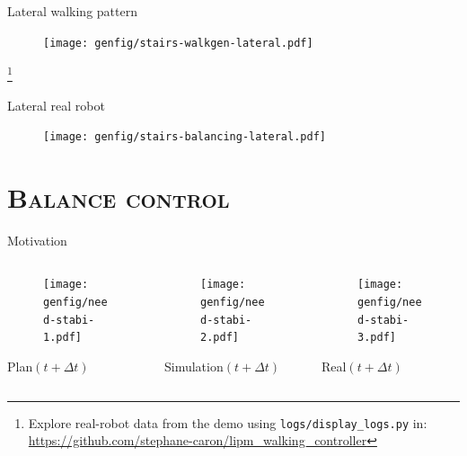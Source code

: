 \documentclass[9pt, aspectratio=43]{beamer}
\newcommand\blfootnote[1]{%
  \begingroup
  \renewcommand\thefootnote{}%
  \footnote{#1}%
  \addtocounter{footnote}{-1}%
  \endgroup
}
\begin{document}
\begin{frame}{Lateral walking pattern}
    \begin{figure}
        \centering
        \texttt{[image: genfig/stairs-walkgen-lateral.pdf]}
    \end{figure}
    \blfootnote{
        Explore real-robot data from the demo using \texttt{logs/display\_logs.py} in: \url{https://github.com/stephane-caron/lipm_walking_controller}
    }
\end{frame}

\begin{frame}{Lateral real robot}
    \begin{figure}
        \centering
        \texttt{[image: genfig/stairs-balancing-lateral.pdf]}
    \end{figure}
\end{frame}


\section*{\textsc{Balance control}}


\begin{frame}{Motivation}
    \begin{columns}
        \begin{column}{0.32\textwidth}
            \begin{figure}
                \centering
                \texttt{[image: genfig/need-stabi-1.pdf]}
            \end{figure}
            \begin{center}
                Plan$(t + \Delta t)$
            \end{center}
        \end{column}
        \begin{column}{0.33\textwidth}
            \begin{figure}
                \centering
                \texttt{[image: genfig/need-stabi-2.pdf]}
            \end{figure}
            \begin{center}
                Simulation$(t + \Delta t)$
            \end{center}
        \end{column}
        \begin{column}{0.32\textwidth}
            \begin{figure}
                \centering
                \texttt{[image: genfig/need-stabi-3.pdf]}
            \end{figure}
            \begin{center}
                Real$(t + \Delta t)$
            \end{center}
        \end{column}
    \end{columns}
\end{frame}
\end{document}

